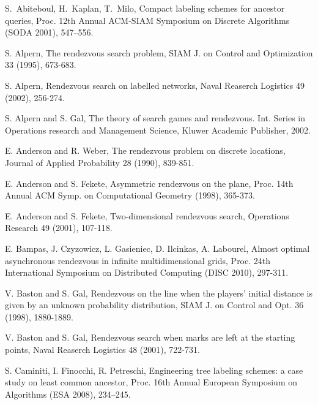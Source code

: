 \documentclass{llncs}
\begin{document}
 







\begin{thebibliography}{12}


S.~Abiteboul, H.~Kaplan, T.~Milo, Compact labeling schemes for ancestor
queries, Proc. 12th Annual ACM-SIAM Symposium on Discrete
Algorithms (SODA 2001), 547--556.

S. Alpern,
The rendezvous search problem,
SIAM J. on Control and Optimization 33 (1995), 673-683.


S. Alpern,
Rendezvous search on labelled networks,
Naval Reaserch Logistics 49 (2002), 256-274.

S. Alpern and S. Gal,
The theory of search games and rendezvous.
Int. Series in Operations research and Management Science,
Kluwer Academic Publisher, 2002.




E. Anderson and R. Weber,
The rendezvous problem on discrete locations,
Journal of Applied Probability 28 (1990), 839-851.

E. Anderson and S. Fekete,
Asymmetric rendezvous on the plane,
Proc. 14th Annual ACM Symp. on Computational Geometry (1998), 365-373.

E. Anderson and S. Fekete,
Two-dimensional rendezvous search,
Operations Research 49 (2001), 107-118.


E. Bampas, J. Czyzowicz, L. Gasieniec, D. Ilcinkas, A. Labourel, Almost optimal asynchronous rendezvous in infinite multidimensional grids,
Proc. 24th International Symposium on Distributed Computing (DISC 2010),  297-311.


V. Baston and S. Gal,
Rendezvous on the line when the players' initial distance is
given by an unknown probability distribution,
SIAM J. on Control and Opt. 36 (1998), 1880-1889.

V. Baston and S. Gal,
Rendezvous search when marks are left at the starting
points,
Naval Reaserch Logistics 48 (2001), 722-731.

S. Caminiti, I. Finocchi, R. Petreschi,
Engineering tree labeling schemes: a case study on least common ancestor,
Proc. 16th Annual European Symposium on Algorithms (ESA 2008), 234--245.




\end{thebibliography}
\end{document}
